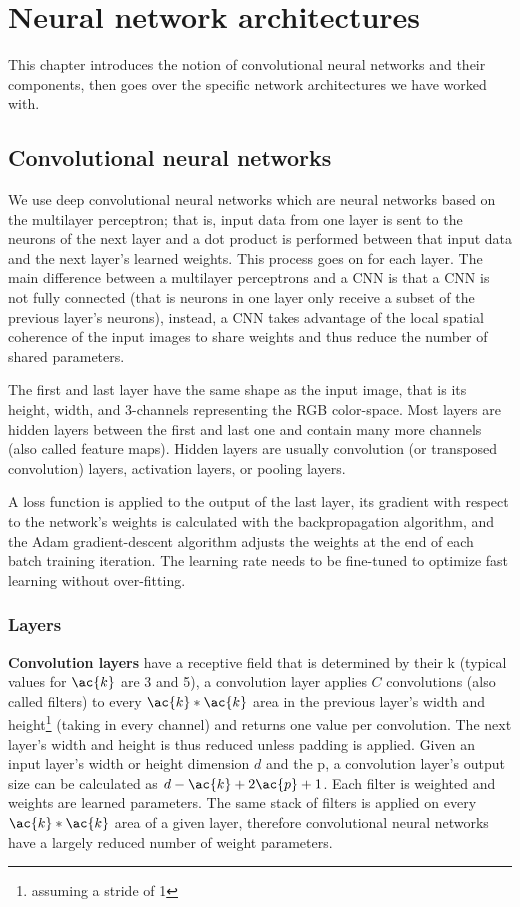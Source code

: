 \chapter{Neural network architectures}

This chapter introduces the notion of convolutional neural networks and their components, then goes over the specific network architectures we have worked with.

\section{Convolutional neural networks}

We use deep convolutional neural networks which are neural networks based on the multilayer perceptron; that is, input data from one layer is sent to the neurons of the next layer and a dot product is performed between that input data and the next layer's learned weights. This process goes on for each layer. The main difference between a multilayer perceptrons and a \ac{CNN} is that a \ac{CNN} is not fully connected (that is neurons in one layer only receive a subset of the previous layer's neurons), instead, a \ac{CNN} takes advantage of the local spatial coherence of the input images to share weights and thus reduce the number of shared parameters.

The first and last layer have the same shape as the input image, that is its height, width, and 3-channels representing the RGB color-space. Most layers are hidden layers between the first and last one and contain many more channels (also called feature maps). Hidden layers are usually convolution (or transposed convolution) layers, activation layers, or pooling layers.

A loss function is applied to the output of the last layer, its gradient with respect to the network's weights is calculated with the backpropagation algorithm, and the Adam gradient-descent algorithm\cite{adam} adjusts the weights at the end of each batch training iteration. The learning rate needs to be fine-tuned to optimize fast learning without over-fitting.

\subsection{Layers}

\textbf{Convolution layers} have a receptive field that is determined by their \ac{k} (typical values for $\ac{k}$ are 3 and 5), a convolution layer applies $C$ convolutions (also called filters) to every $\ac{k}*\ac{k}$ area in the previous layer's width and height\footnote{assuming a stride of 1} (taking in every channel) and returns one value per convolution. The next layer's width and height is thus reduced unless padding is applied. Given an input layer's width or height dimension $d$ and the \ac{p}, a convolution layer's output size can be calculated as $d-\ac{k}+2\ac{p}+1$. Each filter is weighted and weights are learned parameters. The same stack of filters is applied on every $\ac{k}*\ac{k}$ area of a given layer, therefore convolutional neural networks have a largely reduced number of weight parameters.

